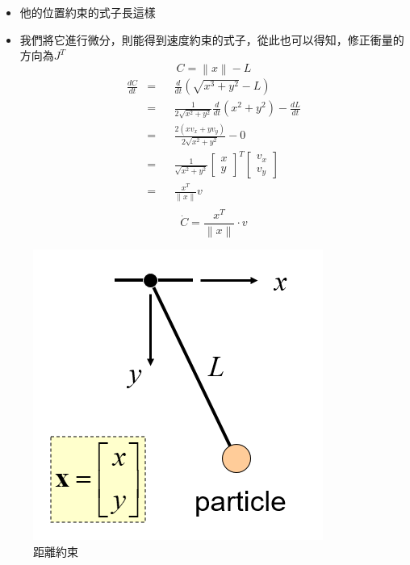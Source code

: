 \begin{itemize}
    \item{他的位置約束的式子長這樣}
    \item{我們將它進行微分，則能得到速度約束的式子，從此也可以得知，修正衝量的方向為$J^{T}$}
        \begin{equation} C = \left \|x  \right \| - L \end{equation}
        \begin{equation}
            \begin{aligned}
            \frac{dC}{dt}&=&& \frac{d}{dt}\left(\sqrt{x^3+y^2}-L\right) \\
                         &=&& \frac{1}{2\sqrt{x^2+y^2}}\frac{d}{dt}(x^2+y^2)-\frac{dL}{dt}\\
                         &=&& \frac{2(xv_x+yv_y)}{2\sqrt{x^2+y^2}}-0\\
                         &=&& \frac{1}{\sqrt{x^2+y^2}} \begin{bmatrix}x\\y\end{bmatrix}^T \begin{bmatrix}v_x\\v_y\end{bmatrix} \\
                         &=&& \frac{x^T}{\parallel x\parallel}v \\
            \end{aligned}
        \end{equation}
        \begin{equation} \dot{C} = \frac{x^{T}}{\left \|x  \right \|} \cdot v \end{equation}
\end{itemize}

\begin{figure}[h]
    \begin{center}
        \includegraphics[height=0.4\linewidth]{./resources/physics/disCon.png}
    \end{center}
    \caption{距離約束}
    \label{disConstraint}
\end{figure}

